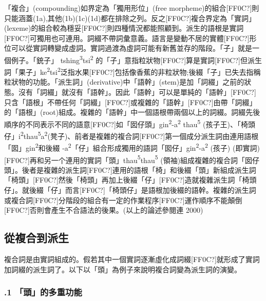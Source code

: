 \textrm{「複合」(compounding)如界定為「獨用形位」(free morpheme)的組合[FF0C?]則只能涵蓋(1a),其他(1b)(1c)(1d)都在排除之列。反之[FF0C?]複合界定為「實詞」(lexeme)的組合較為穩妥[FF0C?]則四種情況都能照顧到。派生的語根是實詞[FF0C?]可獨用也可連用。詞綴不帶詞彙意義。語言是變動不居的實體[FF0C?]形位可以從實詞轉變成虛詞。實詞過渡為虛詞可能有新舊並存的階段。「子」就是一個例子。「銃子」 tshing}\textrm{\textsuperscript{3}}\textrm{tsi}\textrm{\textsuperscript{2} }\textrm{的「子」意指粒狀物[FF0C?]算是實詞[FF0C?]但派生詞「果子」ke}\textrm{\textsuperscript{2}}\textrm{tsi}\textrm{\textsuperscript{2}}\textrm{泛指水果[FF0C?]包括像香蕉的非粒狀物;後綴「子」已失去指稱粒狀物的功能。「派生詞」(derivative)中「語幹」(stem)是加「詞綴」之前的狀態。沒有「詞綴」就沒有「語幹」。因此「語幹」可以是單純的「語幹」[FF0C?]只含「語根」不帶任何「詞綴」[FF0C?]或複雜的「語幹」[FF0C?]由帶「詞綴」的「語根」(root)組成。複雜的「語幹」中一個語根帶兩個以上的詞綴。詞綴先後順序的不同表示不同的語意[FF0C?]如「囡仔頭」gin}\textrm{\textsuperscript{2}}\textrm{{}-a}\textrm{\textsuperscript{2}} \textrm{thau}\textrm{\textsuperscript{5}} \textrm{(孩子王)}、\textrm{「椅頭仔」i}\textrm{\textsuperscript{2}}\textrm{thau}\textrm{\textsuperscript{5}}\textrm{a}\textrm{\textsuperscript{2}}\textrm{(凳子)}、\textrm{前者是複雜的複合詞[FF0C?]第一個成分派生詞由連用語根「囡」gin}\textrm{\textsuperscript{2}}\textrm{和後綴 {}-a}\textrm{\textsuperscript{2}}\textrm{「仔」組合形成獨用的語詞「囡仔」gin}\textrm{\textsuperscript{2}}\textrm{{}-a}\textrm{\textsuperscript{2}} \textrm{(孩子) (即實詞)}[FF0C?]\textrm{再和另一个連用的實詞「頭」thau}\textrm{\textsuperscript{5}}\textrm{thau}\textrm{\textsuperscript{5} }\textrm{(領袖)組成複雜的複合詞「囡仔頭」。後者是複雜的派生詞[FF0C?]連用的語根「椅」和後綴「頭」新組成派生詞「椅頭」[FF0C?]然後「椅頭」再加上後綴「仔」[FF0C?]造就複雜派生詞「椅頭仔」。就後綴「仔」而言[FF0C?]「椅頭仔」是語根加後綴的語幹。複雜的派生詞或複合詞[FF0C?]分階段的組合有一定的作業程序[FF0C?]運作順序不能顛倒[FF0C?]否則會產生不合語法的後果。(以上的論述參閱連 2000)}

\subsection{ 從複合到派生}

\textrm{複合詞是由實詞組成的。假若其中一個實詞逐漸虛化成詞綴[FF0C?]就形成了實詞加詞綴的派生詞了。以下以「頭」為例子來說明複合詞變為派生詞的演變。}

\subsubsection{.1 「頭」的多重功能}

